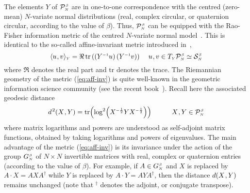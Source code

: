 \documentclass[draftclsnofoot]{IEEEtran}
\begin{document}
The elements $Y$ of $\mathcal{P}^{\hspace{0.02cm}\scriptscriptstyle \beta}_{\scriptscriptstyle N}$ are in one-to-one correspondence with the centred (zero-mean) $N$-variate normal distributions (real, complex circular, or quaternion circular, according to the value of $\beta$). Thus, $\mathcal{P}^{\hspace{0.02cm}\scriptscriptstyle \beta}_{\scriptscriptstyle N}$ can be equipped with the Rao-Fisher information metric of the centred $N$-variate normal model~\cite{amaribook}. This is identical to the so-called affine-invariant metric introduced in~\cite{Pennec2006},
\begin{equation} \label{eq:aff-inv}
\langle u\hspace{0.02cm},v\rangle_{\scriptscriptstyle Y} = \Re\,\mathrm{tr}\left(\left(Y^{\scriptscriptstyle -1}u\right)\left(Y^{\scriptscriptstyle -1}v\right)\right)
\hspace{0.4cm}
u\hspace{0.02cm},v \in T_{\scriptscriptstyle Y}\mathcal{P}^{\hspace{0.02cm}\scriptscriptstyle \beta}_{\scriptscriptstyle N} \simeq \mathcal{S}^{\hspace{0.02cm}\scriptscriptstyle \beta}_{\scriptscriptstyle N}
\end{equation}
where $\Re$ denotes the real part and $\mathrm{tr}$ denotes the trace. The Riemannian geometry of the metric (\ref{eq:aff-inv}) is quite well-known in the geometric information science community (see the recent book~\cite{Pennec2019}). Recall here the associated geodesic distance
\begin{equation} \label{eq:aff-dist}
 d^{\hspace{0.03cm} 2}(X\hspace{0.02cm},Y) = \mathrm{tr}\!\left(\log^2\!\left(X^{\scriptscriptstyle -\frac{1}{2}}Y X^{\scriptscriptstyle -\frac{1}{2}}\right)\right)
 \hspace{1cm}
X\hspace{0.02cm},Y \in \mathcal{P}^{\hspace{0.02cm}\scriptscriptstyle \beta}_{\scriptscriptstyle N}
\end{equation}
where matrix logarithms and powers are understood as self-adjoint matrix functions, obtained by taking logarithms and powers of eigenvalues. The main advantage of the metric (\ref{eq:aff-inv}) is its invariance under the action of the group $G^{\hspace{0.02cm}\scriptscriptstyle \beta}_{\scriptscriptstyle N}$ of $N \times N$ invertible matrices with real, complex or quaternion entries (according to the value of $\beta$). For example, if $A \in G^{\hspace{0.02cm}\scriptscriptstyle \beta}_{\scriptscriptstyle N}$ and $X$ is replaced by $A\cdot X = AX\!A^\dagger$ while $Y$ is replaced by $A\cdot Y = AY\!A^\dagger$, then the distance $d(X\hspace{0.02cm},Y)$ remains unchanged (note that $^\dagger$ denotes the adjoint, or conjugate transpose). 
\end{document}
